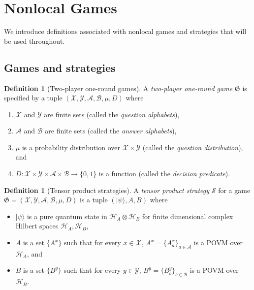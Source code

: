 \documentclass[11pt]{article}
\theoremstyle{definition}
\newtheorem{definition}[theorem]{Definition}
\newcommand{\ket}[1]{|#1\rangle}
\newcommand{\mH}{\ensuremath{\mathcal{H}}}
\newcommand{\game}{\mathfrak{G}}
\newcommand{\strategy}{\mathscr{S}}
\renewcommand{\cal}[1]{\mathcal{#1}}
\begin{document}
\section{Nonlocal Games}
\label{sec:games}

We introduce definitions associated with nonlocal games and strategies that will
be used throughout.

\subsection{Games and strategies}

\begin{definition}[Two-player one-round games]
  \label{def:game}
  A \emph{two-player one-round game} $\game$ is specified by a tuple
  $(\cal{X}, \cal{Y}, \cal{A}, \cal{B}, \mu, D)$ where
  \begin{enumerate}
  \item $\cal{X}$ and $\cal{Y}$ are finite sets (called the \emph{question
      alphabets}),
  \item $\cal{A}$ and $\cal{B}$ are finite sets (called the \emph{answer
      alphabets}),
  \item $\mu$ is a probability distribution over $\cal{X} \times \cal{Y}$
    (called the \emph{question distribution}), and
  \item $D: \cal{X} \times \cal{Y} \times \cal{A} \times \cal{B} \to \{0,1\}$ is
    a function (called the \emph{decision predicate}).
  \end{enumerate}
\end{definition}

\begin{definition}[Tensor product strategies]
  \label{def:tensor-product-strategy}
  A \emph{tensor product strategy} $\strategy$ for a game $\game = (\cal{X},
  \cal{Y}, \cal{A}, \cal{B}, \mu, D)$ is a tuple $(\ket{\psi}, A, B)$ where
  \begin{itemize}
	\item $\ket{\psi}$ is a pure quantum state in $\mH_A \otimes \mH_B$ for finite
    dimensional complex Hilbert spaces $\mH_A, \mH_B$,
	\item $A$ is a set $\{A^x\}$ such that for every $x \in \cal{X}$, $A^x =
    \{A^x_a \}_{a \in \cal{A}}$ is a POVM over $\mH_A$, and
	\item $B$ is a set $\{B^y\}$ such that for every $y \in \cal{Y}$, $B^y =
    \{B^y_b \}_{b \in \cal{B}}$ is a POVM over $\mH_B$.
\end{itemize}
\end{definition}
\end{document}

